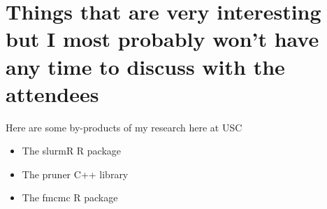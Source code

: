 \documentclass[aspectratio=169, 9pt]{beamer}\usepackage[]{graphicx}\usepackage[]{color}
\begin{document}
\section{Things that are very interesting but I most probably won't have any time to discuss with the attendees}

\begin{frame}
Here are some by-products of my research here at USC

\begin{itemize}
\item The slurmR R package
\item The pruner C++ library
\item The fmcmc R package
\end{itemize}

\end{frame}


\end{document}

